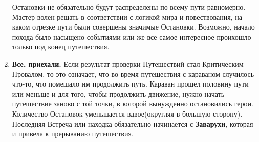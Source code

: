 \begin{enumerate}
\begin{tcolorbox}
Остановки не обязательно будут распределены по всему пути равномерно. Мастер волен решать в соответствии с логикой мира и повествования, на каком отрезке пути были совершены значимые Остановки. Возможно, начало похода было насыщено событиями или же все самое интересное проихошло только под конец путешествия.
\end{tcolorbox}
\item \textbf{Все, приехали.} Если результат проверки Путешествий стал Критическим Провалом, то это означает, что во время путешествия с караваном случилось что-то, что помешало им продолжить путь. Караван прошел половину пути или меньше и для того, чтобы продолжить движение, нужно начать путешествие заново с той точки, в которой вынужденно остановились герои.
\newline Количество Остановок уменьшается вдвое(округляя в большую сторону). Последняя Встреча или находка обязательно начинается с \textbf{Заварухи}, которая и привела к прерыванию путешествия.


\end{enumerate}
